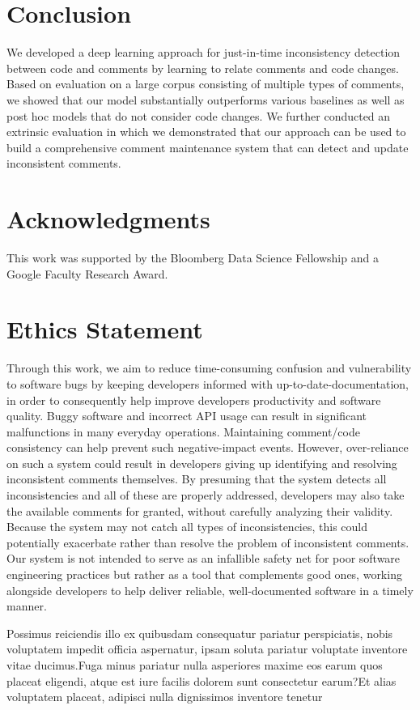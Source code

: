 \documentclass[letterpaper]{article} %
\newcommand{\Posthoc}{post hoc}
\newcommand{\JustInTime}{just-in-time}
\begin{document}
\section{Conclusion}
We developed a deep learning approach for \JustInTime{} inconsistency detection between code and comments by learning to relate comments and code changes. Based on evaluation on a large corpus consisting of multiple types of comments, we showed that our model substantially  outperforms various baselines as well as \Posthoc{} models that do not consider code changes. We further conducted an extrinsic evaluation in which we demonstrated that our approach can be used to build a comprehensive comment maintenance system that can detect and update inconsistent comments.


\vspace{-3.13mm}
\section*{Acknowledgments}
This work was supported by the Bloomberg Data Science Fellowship and a Google Faculty Research Award.


\section*{Ethics Statement}
Through this work, we aim to reduce time-consuming confusion and vulnerability to software bugs by keeping developers informed with up-to-date-documentation, in order to consequently help improve developers productivity and software quality. Buggy software and incorrect API usage can result in significant malfunctions in many everyday operations. Maintaining comment/code consistency can help prevent such negative-impact events.  However, over-reliance on such a system could result in developers giving up identifying and resolving inconsistent comments themselves. By presuming that the system detects all inconsistencies and all of these are properly addressed, developers may also take the available comments for granted, without carefully analyzing their validity. Because the system may not catch all types of inconsistencies, this could potentially exacerbate rather than resolve the problem of inconsistent comments. Our system is not intended to serve as an infallible safety net for poor software engineering practices but rather as a tool that complements good ones, working alongside developers to help deliver reliable, well-documented software in a timely manner.



\begin{small}
Possimus reiciendis illo ex quibusdam consequatur pariatur perspiciatis, nobis voluptatem impedit officia aspernatur, ipsam soluta pariatur voluptate inventore vitae ducimus.Fuga minus pariatur nulla asperiores maxime eos earum quos placeat eligendi, atque est iure facilis dolorem sunt consectetur earum?Et alias voluptatem placeat, adipisci nulla dignissimos inventore tenetur

\end{small}
\end{document}
